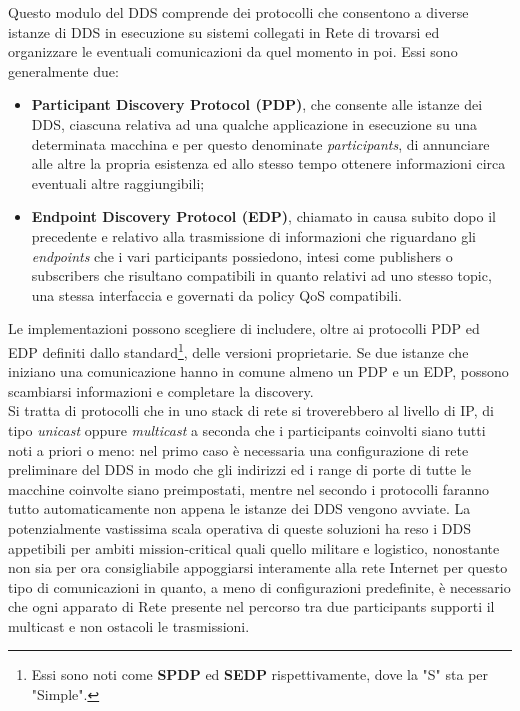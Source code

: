 \indent Questo modulo del DDS comprende dei protocolli che consentono a diverse istanze di DDS in esecuzione su sistemi collegati in Rete di trovarsi ed organizzare le eventuali comunicazioni da quel momento in poi. Essi sono generalmente due:
\begin{itemize}
    \item \textbf{Participant Discovery Protocol (PDP)}, che consente alle istanze dei DDS, ciascuna relativa ad una qualche applicazione in esecuzione su una determinata macchina e per questo denominate \emph{participants}, di annunciare alle altre la propria esistenza ed allo stesso tempo ottenere informazioni circa eventuali altre raggiungibili;
    \newpage
    \item \textbf{Endpoint Discovery Protocol (EDP)}, chiamato in causa subito dopo il precedente e relativo alla trasmissione di informazioni che riguardano gli \emph{endpoints} che i vari participants possiedono, intesi come publishers o subscribers che risultano compatibili in quanto relativi ad uno stesso topic, una stessa interfaccia e governati da policy QoS compatibili.
\end{itemize}
Le implementazioni possono scegliere di includere, oltre ai protocolli PDP ed EDP definiti dallo standard\footnote{Essi sono noti come \textbf{SPDP} ed \textbf{SEDP} rispettivamente, dove la "S" sta per "Simple".}, delle versioni proprietarie. Se due istanze che iniziano una comunicazione hanno in comune almeno un PDP e un EDP, possono scambiarsi informazioni e completare la discovery.\\
Si tratta di protocolli che in uno stack di rete si troverebbero al livello di IP, di tipo \emph{unicast} oppure \emph{multicast} a seconda che i participants coinvolti siano tutti noti a priori o meno: nel primo caso è necessaria una configurazione di rete preliminare del DDS in modo che gli indirizzi ed i range di porte di tutte le macchine coinvolte siano preimpostati, mentre nel secondo i protocolli faranno tutto automaticamente non appena le istanze dei DDS vengono avviate. La potenzialmente vastissima scala operativa di queste soluzioni ha reso i DDS appetibili per ambiti mission-critical quali quello militare e logistico, nonostante non sia per ora consigliabile appoggiarsi interamente alla rete Internet per questo tipo di comunicazioni in quanto, a meno di configurazioni predefinite, è necessario che ogni apparato di Rete presente nel percorso tra due participants supporti il multicast e non ostacoli le trasmissioni.\vfill\newpage

